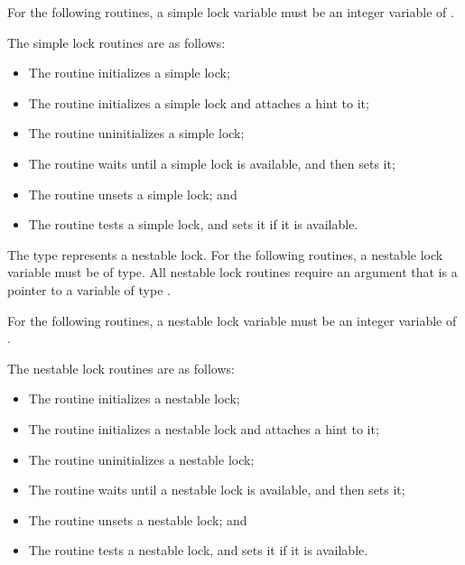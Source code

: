\begin{fortranspecific}
For the following routines, a simple lock variable must be an integer 
variable of .
\end{fortranspecific}

The simple lock routines are as follows:

\begin{itemize}
\item The  routine initializes a simple lock;
\item The  routine initializes a simple 
      lock and attaches a hint to it;
\item The  routine uninitializes a simple lock;
\item The  routine waits until a simple lock is 
      available, and then sets it;
\item The  routine unsets a simple lock; and
\item The  routine tests a simple lock, and sets 
      it if it is available.
\end{itemize}

\begin{ccppspecific}
The type  represents a nestable lock. For the 
following routines, a nestable lock variable must be of 
 type. All nestable lock routines require an 
argument that is a pointer to a variable of type .
\end{ccppspecific}

\begin{fortranspecific}
For the following routines, a nestable lock variable must be an 
integer variable of .
\end{fortranspecific}

The nestable lock routines are as follows:

\begin{itemize}
\item The  routine initializes a nestable lock;
\item The  routine initializes a 
      nestable lock and attaches a hint to it;
\item The  routine uninitializes a nestable lock;
\item The  routine waits until a nestable lock 
      is available, and then sets it;
\item The  routine unsets a nestable lock; and
\item The  routine tests a nestable lock, and 
      sets it if it is available.
\end{itemize}

